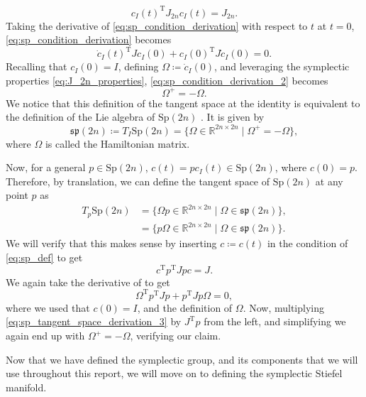 %
\begin{equation}\label{eq:sp_condition_derivation}
c_{I}(t)^{\mathrm{T}}J_{2n}c_{I}(t)=J_{2n}.
\end{equation}
%
Taking the derivative of \eqref{eq:sp_condition_derivation} with respect to $t$ at $t=0$, \eqref{eq:sp_condition_derivation} becomes 
%
\begin{equation}\label{eq:sp_condition_derivation_2}
\dot{c}_{I}(t)^{\mathrm{T}}Jc_{I}(0)+c_{I}(0)^{\mathrm{T}}J \dot{c}_{I}(0)=0.
\end{equation}
%
Recalling that $c_{I}(0)=I$, defining $\Omega \coloneqq \dot{c}_{I}(0)$, and leveraging the symplectic properties \eqref{eq:J_2n_properties}, \eqref{eq:sp_condition_derivation_2} becomes
%
\begin{equation*}
\Omega^{+}=-\Omega.
\end{equation*}
%
We notice that this definition of the tangent space at the identity is equivalent to the definition of the Lie algebra of $\mathrm{Sp}(2n)$ \cite[p.~3]{BendokatZimmermann2021}. It is given by 
%
\begin{equation}\label{eq:sp_Lie_algebra}
    \mathfrak{sp}(2n)\coloneqq T_{I}\mathrm{Sp}(2n)=\{\Omega\in \mathbb{R}^{2n\times2n} \;|\; \Omega^{+}=-\Omega\},
\end{equation}
%
where $\Omega$ is called the Hamiltonian matrix. 

Now, for a general $p \in \mathrm{Sp}(2n)$, $c(t)=pc_{I}(t)\in \mathrm{Sp}(2n)$, where $c(0)=p$. Therefore, by translation, we can define the tangent space of $\mathrm{Sp}(2n)$ at any point $p$  as
%
\begin{equation}\label{eq:sp_tangent_space}
\begin{split}
T_{p}\mathrm{Sp}(2n)&=\{\Omega p\in \mathbb{R}^{2n\times2n} \;|\; \Omega\in\mathfrak{sp}(2n)\},\\
&=\{ p\Omega\in \mathbb{R}^{2n\times2n} \;|\; \Omega\in\mathfrak{sp}(2n)\}.
\end{split}
\end{equation}
%
We will verify that this makes sense by inserting $c\coloneqq c(t)$ in the condition of \eqref{eq:sp_def} to get
%
\begin{equation*}
c^{\mathrm{T}}p^{\mathrm{T}}Jpc=J.
\end{equation*}
%
We again take the derivative of to get
%
\begin{equation}\label{eq:sp_tangent_space_derivation_3}
\Omega ^{\mathrm{T}}p^{\mathrm{T}}Jp+p^{\mathrm{T}}Jp\Omega=0,
\end{equation}
where we used that $c(0)=I$, and the definition of $\Omega$. Now, multiplying \eqref{eq:sp_tangent_space_derivation_3} by $J^{\mathrm{T}}p$ from the left, and simplifying we again end up with $\Omega^{+}=-\Omega$, verifying our claim.

Now that we have defined the symplectic group, and its components that we will use throughout this report, we will move on to defining the symplectic Stiefel manifold.